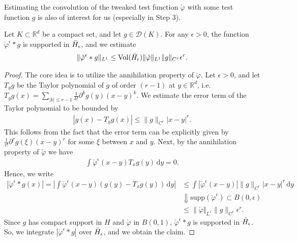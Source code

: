 Estimating the convolution of the tweaked test function $\check \varphi$ with some test function $g$ is also of interest for us (especially in Step 3). 

\begin{lemma}\label{step3:lemma}
    Let $K \subset \mathbb{R}^d$ be a compact set, and let $g \in \mathcal{D}(K)$. For any $\epsilon > 0$, the function $\check \varphi^\epsilon * g$ is supported in $\bar{H}_{\epsilon}$, and we estimate     
    \begin{align*}
        \lVert \check \varphi^{\epsilon} * g \rVert_{L^1} \leq \mathrm{Vol}(\bar{H}_{\epsilon})  \lVert \check \varphi \rVert_{L^1} \lVert g \rVert_{C^r} \epsilon^r.
    \end{align*}
\end{lemma}

\begin{proof}
The core idea is to utilize the annihilation property of $\check \varphi$. Let $\epsilon > 0$, and let $T_yg$ be the Taylor polynomial of $g$ of order $(r-1)$ at $y \in \mathbb{R}^d$, i.e. $T_yg(x) = \sum\limits_{|k| \leq r - 1}\frac{1}{k!}\partial^kg(y)(x-y)^k$. We estimate the error term of the Taylor polynomial to be bounded by 
\begin{align*}
    |g(x) - T_yg(x)| \leq \lVert g \rVert_{C^r} |x-y|^r.
\end{align*}
This follows from the fact that the error term can be explicitly given by $\frac{1}{r!}\partial^{r}g(\xi)(x - y)^r$ for some $\xi$ between $x$ and $y$. Next, by the annihilation property of $\check \varphi$ we have 
\begin{align*}
    \int\check \varphi^{\epsilon}(x - y)T_xg(y)  \, \mathrm{d}y = 0.
\end{align*}
Hence, we write 
\begin{align*}
        |\check \varphi^{\epsilon}* g(x)|  = \left|  \int\check \varphi^{\epsilon}(x - y) (g(y) - T_xg(y) )  \, \mathrm{d}y \right|
        &\leq \int |\check \varphi^{ \epsilon }(x-y)| \lVert g \rVert_{C^r} |x-y|^r \, \mathrm{d}y \\
        &\Downarrow \text{$\mathrm{supp}(\check \varphi^{\epsilon}) \subset B(0,\epsilon)$} \\
        &\leq \lVert \check \varphi \Vert_{L^1 } \lVert g \rVert_{C^r} \epsilon^r.
\end{align*}
Since $g$ has compact support in $H$ and $\check \varphi$ in $B(0,1)$, $\check \varphi^{\epsilon}* g$ is supported in $\bar{H}_{\epsilon}$. So, we integrate $|\check \varphi^{\epsilon}* g|$ over $\bar{H}_{\epsilon}$, and we obtain the claim.
\end{proof}

